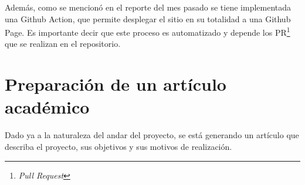 \documentclass[11pt,DIV=9, letterpaper, oneside, openright]{scrartcl}
\begin{document}
Además, como se mencionó en el reporte del mes pasado se tiene implementada una Github Action, que permite desplegar el sitio en su totalidad a una Github Page. Es importante decir que este proceso es automatizado y depende los PR\footnote{\emph{Pull Request}} que se realizan en el repositorio. 

\section{Preparación de un artículo académico}
Dado ya a la naturaleza del andar del proyecto, se está generando un artículo que describa el proyecto, sus objetivos y sus motivos de realización.
\end{document}
